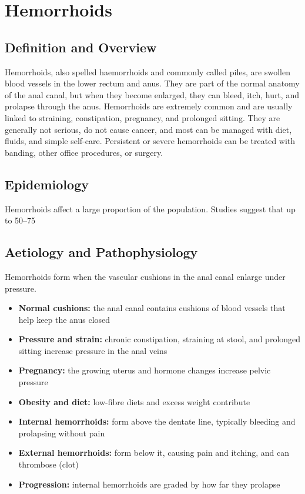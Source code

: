 \chapter{Hemorrhoids}

\section*{Definition and Overview}
Hemorrhoids, also spelled haemorrhoids and commonly called piles, are swollen blood vessels in the lower rectum and anus. They are part of the normal anatomy of the anal canal, but when they become enlarged, they can bleed, itch, hurt, and prolapse through the anus. Hemorrhoids are extremely common and are usually linked to straining, constipation, pregnancy, and prolonged sitting. They are generally not serious, do not cause cancer, and most can be managed with diet, fluids, and simple self-care. Persistent or severe hemorrhoids can be treated with banding, other office procedures, or surgery.

\section*{Epidemiology}
Hemorrhoids affect a large proportion of the population. Studies suggest that up to 50--75%

\section*{Aetiology and Pathophysiology}
Hemorrhoids form when the vascular cushions in the anal canal enlarge under pressure.

\begin{itemize}
    \item \textbf{Normal cushions:} the anal canal contains cushions of blood vessels that help keep the anus closed
    \item \textbf{Pressure and strain:} chronic constipation, straining at stool, and prolonged sitting increase pressure in the anal veins
    \item \textbf{Pregnancy:} the growing uterus and hormone changes increase pelvic pressure
    \item \textbf{Obesity and diet:} low-fibre diets and excess weight contribute
    \item \textbf{Internal hemorrhoids:} form above the dentate line, typically bleeding and prolapsing without pain
    \item \textbf{External hemorrhoids:} form below it, causing pain and itching, and can thrombose (clot)
    \item \textbf{Progression:} internal hemorrhoids are graded by how far they prolapse
\end{itemize}

